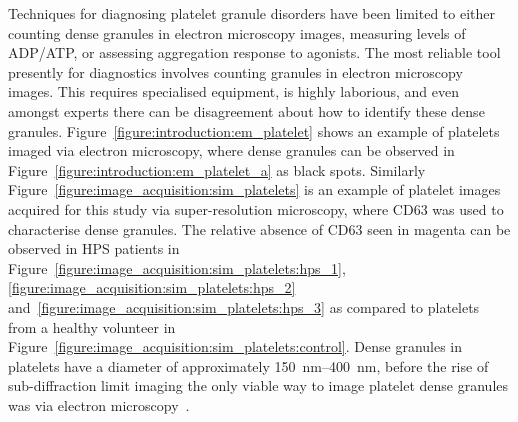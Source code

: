 Techniques for diagnosing platelet granule disorders have been limited to either counting dense granules in electron microscopy images, measuring levels of ADP/ATP, or assessing aggregation response to agonists. The most reliable tool presently for diagnostics involves counting granules in electron microscopy images. This requires specialised equipment, is highly laborious, and even amongst experts there can be disagreement about how to identify these dense granules. Figure~\ref{figure:introduction:em_platelet} shows an example of platelets imaged via electron microscopy, where dense granules can be observed in Figure~\ref{figure:introduction:em_platelet_a} as black spots. Similarly Figure~\ref{figure:image_acquisition:sim_platelets} is an example of platelet images acquired for this study via super-resolution microscopy, where CD63 was used to characterise dense granules. The relative absence of CD63 seen in magenta can be observed in HPS patients in Figure~\ref{figure:image_acquisition:sim_platelets:hps_1}, \ref{figure:image_acquisition:sim_platelets:hps_2} and~\ref{figure:image_acquisition:sim_platelets:hps_3} as compared to platelets from a healthy volunteer in Figure~\ref{figure:image_acquisition:sim_platelets:control}. Dense granules in platelets have a diameter of approximately \SIrange{150}{400}{\nano\meter}, before the rise of sub-diffraction limit imaging the only viable way to image platelet dense granules was via electron microscopy~\cite{Rumbaut2010}.


